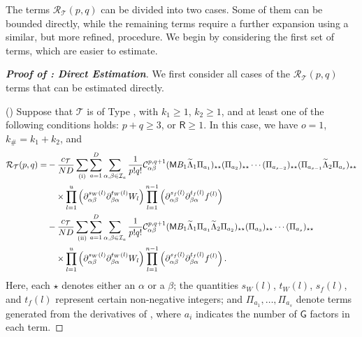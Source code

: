 \documentclass[10pt,reqno]{amsart}
\numberwithin{equation}{section}
\numberwithin{figure}{section}
\newcommand{\rmnum}[1]{\uppercase\expandafter{\romannumeral #1}}
\theoremstyle{plain} %
\theoremstyle{definition} %
\newcommand{\wt}{\widetilde}
\renewcommand{\txt}[1]{\text{\rm{#1}}}
\newcommand{\cT}{\mathcal T}
\newcommand{\cI}{\mathcal{I}}
\newcommand{\cC}{\mathcal{C}}
\newcommand{\cR}{{\mathcal R}}
\newcommand{\sG}{\mathsf G}
\newcommand{\sM}{\mathsf M}
\newcommand{\sR}{\mathsf R}
\renewcommand{\geq}{\ge}
\newcommand{\p}[1]{({#1})}
\newcommand{\pa}[1]{\left({#1}\right)}
\newcommand{\tLambda}{{\wt{\Lambda}}}
\newcommand{\iab}{\alpha\beta}
\newcommand{\iba}{\beta\alpha}
\newcommand{\tl}{\tLambda}
\numberwithin{equation}{section}
\begin{document}
The terms $\cR_{\cT}\pa{p,q}$ can be divided into two cases. Some of them can be bounded directly, while the remaining terms require a further expansion using a similar, but more refined, procedure. We begin by considering the first set of terms, which are easier to estimate.




\begin{proof}[\bf Proof of : Direct Estimation]
We first consider all cases of the $\cR_{\cT}(p, q)$ terms that can be estimated directly. 
\medskip
    
\noindent(\rmnum{1}) Suppose that $\cT$ is of Type \rmnum{1}, with $k_1 \geq 1$, $k_2 \geq 1$, and at least one of the following conditions holds: $p+q\geq 3$, or $\sR\geq 1$. In this case, we have $o=1$, $k_{\#}=k_1+k_2$, and
        \begin{equation}\label{R_cT_typt_1_k_1_geq_1_k_2-geq_1_explicit_expression}
            \begin{aligned}
                \cR_{\cT}\p{p,q}=& -\frac{c_{\cT}}{ND}\sum_{\p{\txt{i}}}\sum_{a=1}^D\sum_{\alpha,\beta\in \cI_a}\frac{1}{p!q!}\cC_{\iab}^{p,q+1}\p{\sM B_1 \tl_1\Pi_{a_1}}_{\star\star}\p{\Pi_{a_2}}_{\star\star}\cdots\p{\Pi_{a_{s-2}}}_{\star\star}\p{\Pi_{a_{s-1}}\tl_2\Pi_{a_s}}_{\star\star}\\
                & \quad\times\prod_{l=1}^{u}\pa{\partial_{\iab}^{s_W\pa{l}}\partial_{\iba}^{t_W\pa{l}}W_l}\prod_{l=1}^{n-1}\pa{\partial_{\iab}^{s_f\pa{l}}\partial_{\iba}^{t_f\pa{l}}f^{\pa{l}}}\\
                &- \frac{c_{\cT}}{ND}\sum_{\pa{\txt{ii}}}\sum_{a=1}^D\sum_{\alpha,\beta\in \cI_a}\frac{1}{p!q!}\cC_{\iab}^{p,q+1}\p{\sM B_1 \tl_1\Pi_{a_1}\tl_2\Pi_{a_2}}_{\star\star}\p{\Pi_{a_3}}_{\star\star}\cdots\p{\Pi_{a_{s}}}_{\star\star}\\
                &\quad\times\prod_{l=1}^{u}\pa{\partial_{\iab}^{s_W\pa{l}}\partial_{\iba}^{t_W\pa{l}}W_l}\prod_{l=1}^{n-1}\pa{\partial_{\iab}^{s_f\pa{l}}\partial_{\iba}^{t_f\pa{l}}f^{\pa{l}}}.
            \end{aligned}
        \end{equation}
    Here, each $\star$ denotes either an $\alpha$ or a $\beta$; the quantities $s_W(l)$, $t_W(l)$, $s_f(l)$, and $t_f(l)$ represent certain non-negative integers; and $\Pi_{a_1}, \ldots, \Pi_{a_s}$ denote terms generated from the derivatives of \smash{$\p{\sM B_1 \tl_1 \Pi_{k_\#-1}\sG}_{\iab}$}, where $a_i$ indicates the number of $\sG$ factors in each term. 

\end{proof}
\end{document}
